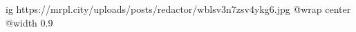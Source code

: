  
 
 
 
 

\ifcmt
  ig https://mrpl.city/uploads/posts/redactor/wblsv3n7zsv4ykg6.jpg
  @wrap center
  @width 0.9
\fi

